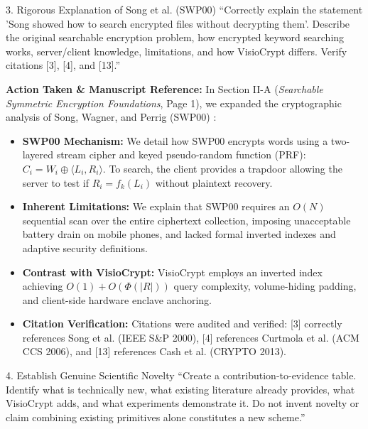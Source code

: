\documentclass[11pt,a4paper]{article}
\begin{document}
\vspace{1em}

\begin{reviewbox}{3. Rigorous Explanation of Song et al. (SWP00)}
``Correctly explain the statement 'Song showed how to search encrypted files without decrypting them'. Describe the original searchable encryption problem, how encrypted keyword searching works, server/client knowledge, limitations, and how VisioCrypt differs. Verify citations [3], [4], and [13].''
\end{reviewbox}

\begin{responsebox}
\textbf{Action Taken \& Manuscript Reference:} In Section II-A (\emph{Searchable Symmetric Encryption Foundations}, Page 1), we expanded the cryptographic analysis of Song, Wagner, and Perrig (SWP00) \cite{song2000}:
\begin{itemize}[itemsep=2pt]
    \item \textbf{SWP00 Mechanism:} We detail how SWP00 encrypts words using a two-layered stream cipher and keyed pseudo-random function (PRF): $C_i = W_i \oplus \langle L_i, R_i \rangle$. To search, the client provides a trapdoor allowing the server to test if $R_i = f_k(L_i)$ without plaintext recovery.
    \item \textbf{Inherent Limitations:} We explain that SWP00 requires an $O(N)$ sequential scan over the entire ciphertext collection, imposing unacceptable battery drain on mobile phones, and lacked formal inverted indexes and adaptive security definitions.
    \item \textbf{Contrast with VisioCrypt:} VisioCrypt employs an inverted index achieving $O(1) + O(\Phi(|R|))$ query complexity, volume-hiding padding, and client-side hardware enclave anchoring.
    \item \textbf{Citation Verification:} Citations were audited and verified: [3] correctly references Song et al. (IEEE S\&P 2000), [4] references Curtmola et al. (ACM CCS 2006), and [13] references Cash et al. (CRYPTO 2013).
\end{itemize}
\end{responsebox}

\vspace{1em}

\begin{reviewbox}{4. Establish Genuine Scientific Novelty}
``Create a contribution-to-evidence table. Identify what is technically new, what existing literature already provides, what VisioCrypt adds, and what experiments demonstrate it. Do not invent novelty or claim combining existing primitives alone constitutes a new scheme.''
\end{reviewbox}
\end{document}
